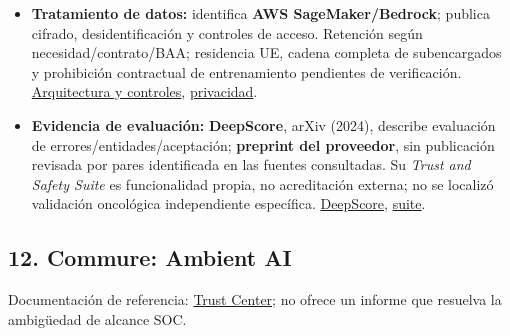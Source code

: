 \begin{itemize}
\item \textbf{Tratamiento de datos:} identifica \textbf{AWS SageMaker/\allowbreak{}Bedrock}; publica cifrado, desidentificación y controles de acceso. Retención según necesidad/\allowbreak{}contrato/\allowbreak{}BAA; residencia UE, cadena completa de subencargados y prohibición contractual de entrenamiento pendientes de verificación. \href{https://www.deepscribe.ai/resources/deepscribe-launches-new-and-innovative-trust-and-safety-suite-for-its-ambient-ai-technology}{Arquitectura y controles}, \href{https://www.deepscribe.ai/privacy}{privacidad}.
\item \textbf{Evidencia de evaluación:} \textbf{DeepScore}, arXiv (2024), describe evaluación de errores/\allowbreak{}entidades/\allowbreak{}aceptación; \textbf{preprint del proveedor}, sin publicación revisada por pares identificada en las fuentes consultadas. Su \emph{Trust and Safety Suite} es funcionalidad propia, no acreditación externa; no se localizó validación oncológica independiente específica. \href{https://arxiv.org/abs/2409.16307}{DeepScore}, \href{https://www.deepscribe.ai/resources/deepscribe-launches-new-and-innovative-trust-and-safety-suite-for-its-ambient-ai-technology}{suite}.
\end{itemize}

\subsection*{12. Commure: Ambient AI}
\label{provider:12}

Documentación de referencia: \href{https://www.commure.com/trust-center}{Trust Center}; no ofrece un informe que resuelva la ambigüedad de alcance SOC.

